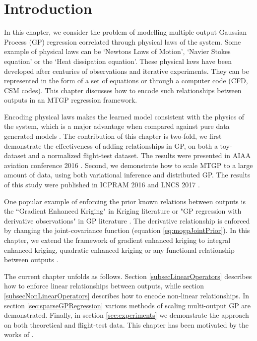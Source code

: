 
\section{Introduction}
In this chapter, we consider the problem of modelling multiple output Gaussian Process (GP) regression correlated through physical laws of the system. Some example of physical laws can be `Newtons Laws of Motion', `Navier Stokes equation' or the `Heat dissipation equation'. These physical laws have been developed after centuries of observations and iterative experiments. They can be represented in the form of a set of equations or through a computer code (CFD, CSM codes). This chapter discusses how to encode such relationships between outputs in an MTGP regression framework. 

Encoding physical laws makes the learned model consistent with the physics of the system, which is a major advantage when compared against pure data generated models \cite{jazwinski2007stochastic}. The contribution of this chapter is two-fold, we first demonstrate the effectiveness of adding relationships in GP, on both a toy-dataset and a normalized flight-test dataset. The results were presented in AIAA aviation conference 2016 \cite{oatao18001}. Second, we demonstrate how to scale MTGP to a large amount of data, using both variational inference and distributed GP. The results of this study were published in ICPRAM 2016 and LNCS 2017 \cite{icpram16Ankit, oatao18000}.

One popular example of enforcing the prior known relations between outputs is the ``Gradient Enhanced Kriging" in Kriging literature \cite{chung2002using, morris1993bayesian, forrester2009recent} or "GP regression with derivative observations" in GP literature \cite{NIPSDerivativeGP}. The derivative relationship is enforced by changing the joint-covariance function (equation \ref{eq:mogpJointPrior}). In this chapter, we extend the framework of gradient enhanced kriging to integral enhanced kriging, quadratic enhanced kriging or any functional relationship between outputs \cite{Constantinescu2013}.  

The current chapter unfolds as follows. Section \ref{subsecLinearOperators} describes how to enforce linear relationships between outputs, while section \ref{subsecNonLinearOperators} describes how to encode non-linear relationships. In section \ref{sec:sparseGPRegression} various methods of scaling multi-output GP are demonstrated. Finally, in section \ref{sec:experiments} we demonstrate the approach on both theoretical and flight-test data. This chapter has been motivated by the works of \cite{Constantinescu2013, journals/jmlr/AlvarezLL09, sarkka2011linear, jidling2017linearly, ginsbourger2013invariances, sarkka2011linear}.


